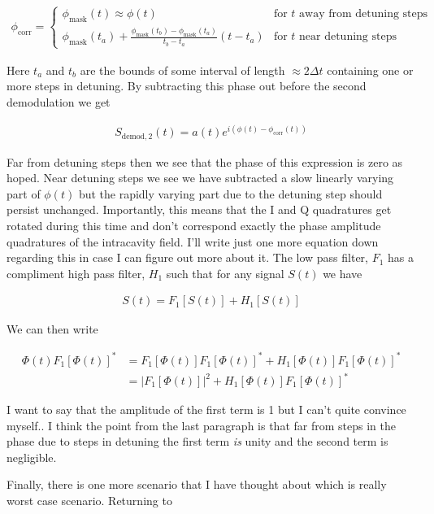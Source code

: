 \documentclass[12pt]{article}
\begin{document}
\begin{align}
\phi_{\text{corr}} = 
\begin{cases}
\phi_{\text{mask}}(t) \approx \phi(t) & \text{for $t$ away from detuning steps}\\
\phi_{\text{mask}}(t_a) + \frac{\phi_{\text{mask}}(t_b) - \phi_{\text{mask}}(t_a)}{t_b-t_a}(t-t_a) & \text{for $t$ near detuning steps}
\end{cases}
\end{align}

Here $t_a$ and $t_b$ are the bounds of some interval of length $\approx 2\Delta t$ containing one or more steps in detuning. By subtracting this phase out before the second demodulation we get

\begin{align}
S_{\text{demod},2}(t) = a(t) e^{i(\phi(t) - \phi_{\text{corr}}(t))}
\end{align}

Far from detuning steps then we see that the phase of this expression is zero as hoped. Near detuning steps we see we have subtracted a slow linearly varying part of $\phi(t)$ but the rapidly varying part due to the detuning step should persist unchanged. Importantly, this means that the I and Q quadratures get rotated during this time and don't correspond exactly the phase amplitude quadratures of the intracavity field.
I'll write just one more equation down regarding this in case I can figure out more about it. The low pass filter, $F_1$ has a compliment high pass filter, $H_1$ such that for any signal $S(t)$ we have

\begin{align}
S(t) = F_1[S(t)] + H_1[S(t)]
\end{align}

We can then write

\begin{align}
\Phi(t)F_1[\Phi(t)]^* &= F_1[\Phi(t)]F_1[\Phi(t)]^* + H_1[\Phi(t)]F_1[\Phi(t)]^*\\
&= |F_1[\Phi(t)]|^2 + H_1[\Phi(t)]F_1[\Phi(t)]^*
\end{align}

I want to say that the amplitude of the first term is 1 but I can't quite convince myself.. I think the point from the last paragraph is that far from steps in the phase due to steps in detuning the first term \textit{is} unity and the second term is negligible. 

Finally, there is one more scenario that I have thought about which is really worst case scenario. Returning to 
\end{document}
